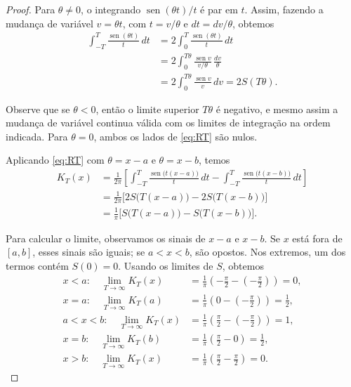 \documentclass[12pt,portuguese]{article}
\theoremstyle{definition}
\theoremstyle{plainexercise}
\theoremstyle{starredexercise}
\theoremstyle{definition}
\renewcommand{\sin}{\operatorname{sen}}
\begin{document}
\begin{proof}
Para $\theta\neq0$, o integrando $\sin(\theta t)/t$ é par em $t$. Assim,
fazendo a mudança de variável $v=\theta t$, com $t=v/\theta$ e
$dt=dv/\theta$, obtemos
\begin{equation}\label{eq:RT}
\begin{aligned}
\int_{-T}^{T}\frac{\sin(\theta t)}{t}\,dt
&=2\int_0^T\frac{\sin(\theta t)}{t}\,dt
\\[0.3cm]
&=2\int_0^{T\theta}\frac{\sin v}{v/\theta}\,\frac{dv}{\theta}
\\[0.3cm]
&=2\int_0^{T\theta}\frac{\sin v}{v}\,dv
=2S(T\theta).
\end{aligned}
\end{equation}

Observe que se $\theta<0$, então o limite superior $T\theta$ é negativo, e mesmo assim a mudança de
variável continua válida com os limites de integração na ordem indicada.
Para $\theta=0$, ambos os lados de \eqref{eq:RT} são nulos.

Aplicando \eqref{eq:RT} com $\theta=x-a$ e $\theta=x-b$, temos
\begin{align*}
K_T(x)
&=\frac{1}{2\pi}\left[
\int_{-T}^{T}\frac{\sin\bigl(t(x-a)\bigr)}{t}\,dt
-\int_{-T}^{T}\frac{\sin\bigl(t(x-b)\bigr)}{t}\,dt
\right]
\\[0.3cm]
&=\frac{1}{2\pi}\bigl[2S\bigl(T(x-a)\bigr)-2S\bigl(T(x-b)\bigr)\bigr]
\\[0.3cm]
&=\frac{1}{\pi}\bigl[S\bigl(T(x-a)\bigr)-S\bigl(T(x-b)\bigr)\bigr].
\end{align*}

Para calcular o limite, observamos os sinais de $x-a$ e $x-b$. Se $x$ está
fora de $[a,b]$, esses sinais são iguais; se $a<x<b$, são opostos. Nos
extremos, um dos termos contém $S(0)=0$. Usando os limites de $S$, obtemos
\begin{align*}
x<a:\quad
\lim_{T\to\infty}K_T(x)
&=\frac{1}{\pi}\left(-\frac{\pi}{2}-\left(-\frac{\pi}{2}\right)\right)=0,
\\[0.3cm]
x=a:\quad
\lim_{T\to\infty}K_T(a)
&=\frac{1}{\pi}\left(0-\left(-\frac{\pi}{2}\right)\right)=\frac12,
\\[0.3cm]
a<x<b:\quad
\lim_{T\to\infty}K_T(x)
&=\frac{1}{\pi}\left(\frac{\pi}{2}-\left(-\frac{\pi}{2}\right)\right)=1,
\\[0.3cm]
x=b:\quad
\lim_{T\to\infty}K_T(b)
&=\frac{1}{\pi}\left(\frac{\pi}{2}-0\right)=\frac12,
\\[0.3cm]
x>b:\quad
\lim_{T\to\infty}K_T(x)
&=\frac{1}{\pi}\left(\frac{\pi}{2}-\frac{\pi}{2}\right)=0.
\end{align*}


\end{proof}
\end{document}
